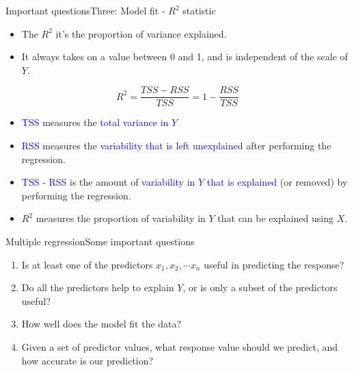\begin{frame}{Important questions}{Three: Model fit - $R^2$ statistic}


\begin{itemize}
    \item The $R^2$ it's the proportion of variance explained. \pause
    \item It always takes on a value between 0 and 1, and is independent of the scale of $Y$. \pause
\end{itemize}

$$R^2 = \frac{TSS - RSS}{TSS} = 1 - \frac{RSS}{TSS}$$

\begin{itemize}
    \item \textcolor{blue}{TSS} measures the \textcolor{blue}{total variance in $Y$} \pause %
    \item \textcolor{blue}{RSS} measures the \textcolor{blue}{variability that is left unexplained} after performing the regression. \pause
    \item \textcolor{blue}{TSS - RSS} is the amount of \textcolor{blue}{variability in $Y$ that is explained} (or removed) by performing the regression. \pause
    \item $R^2$ measures the proportion of variability in $Y$ that can be explained using $X$. \pause
\end{itemize}

\end{frame}


\begin{frame}[noframenumbering]{Multiple regression}{Some important questions}

\begin{enumerate}
    \item<1> Is at least one of the predictors $x_1, x_2, \cdots x_n$ useful in predicting the response?  
    \item<1> Do all the predictors help to explain $Y$, or is only a subset of the predictors useful? 
    \item<1> How well does the model fit the data? 
    \item<1-2> Given a set of predictor values, what response value should we predict, and how accurate is our prediction?
    
\end{enumerate}
\end{frame}


